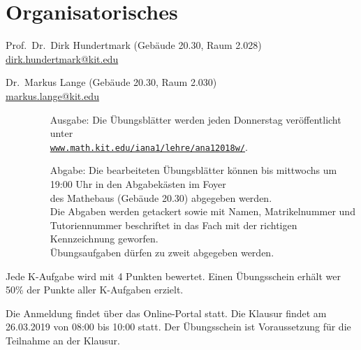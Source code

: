 \documentclass[../ana1.tex]{subfiles}
\begin{document}
\section{Organisatorisches}
\begin{prosa}
    \begin{description}[style=nextline]
        \item[Dozent]
            Prof.\ Dr.\ Dirk Hundertmark (Gebäude 20.30, Raum 2.028)\\
            \href{mailto:dirk.hundertmark@kit.edu}{dirk.hundertmark@kit.edu}
        \item[Übungsleiter]
            Dr.\ Markus Lange (Gebäude 20.30, Raum 2.030)\\
            \href{mailto:markus.lange@kit.edu}{markus.lange@kit.edu}
        \item[Übungsaufgaben]
            \begin{description}
                \item[]
                \begin{enumerate}
                \item[]
                \item[Ausgabe:] Die Übungsblätter werden jeden Donnerstag veröffentlicht unter\\
                                \href{http://www.math.kit.edu/iana1/lehre/ana12018w/}{\texttt{www.math.kit.edu/iana1/lehre/ana12018w/}}.
                \item[Abgabe:] Die bearbeiteten Übungsblätter können bis mittwochs um 19:00 Uhr in den Abgabekästen im Foyer\\
                               des Mathebaus (Gebäude 20.30) abgegeben werden.\\ 
                               Die Abgaben werden getackert sowie mit Namen, Matrikelnummer und Tutoriennummer beschriftet in das Fach mit
                               der richtigen Kennzeichnung geworfen.\\
                               Übungsaufgaben dürfen zu zweit abgegeben werden.\\
                \end{enumerate}
            \end{description}
        \item[Übungsschein]
            Jede K-Aufgabe wird mit 4 Punkten bewertet. Einen Übungsschein erhält wer 50\% der Punkte aller K-Aufgaben erzielt.
        \item[Klausur]
            Die Anmeldung findet über das Online-Portal statt. Die Klausur findet am 26.03.2019 von 08:00 bis 10:00 statt.
            Der Übungsschein ist Voraussetzung für die Teilnahme an der Klausur.
    \end{description}
\end{prosa}
\end{document}

